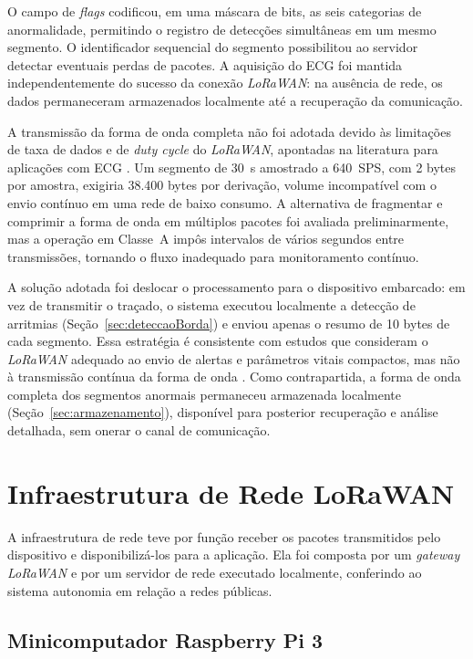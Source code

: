 O campo de \textit{flags} codificou, em uma máscara de bits, as seis categorias de anormalidade, permitindo o registro de detecções simultâneas em um mesmo segmento. O identificador sequencial do segmento possibilitou ao servidor detectar eventuais perdas de pacotes. A aquisição do \acs{ECG} foi mantida independentemente do sucesso da conexão \textit{LoRaWAN}: na ausência de rede, os dados permaneceram armazenados localmente até a recuperação da comunicação.

A transmissão da forma de onda completa não foi adotada devido às limitações de taxa de dados e de \textit{duty cycle} do \textit{LoRaWAN}, apontadas na literatura para aplicações com \acs{ECG} \citep{lorawanWaveform, 3-lead}. Um segmento de 30~s amostrado a 640~SPS, com 2 bytes por amostra, exigiria 38.400 bytes por derivação, volume incompatível com o envio contínuo em uma rede de baixo consumo. A alternativa de fragmentar e comprimir a forma de onda em múltiplos pacotes foi avaliada preliminarmente, mas a operação em Classe~A impôs intervalos de vários segundos entre transmissões, tornando o fluxo inadequado para monitoramento contínuo.

A solução adotada foi deslocar o processamento para o dispositivo embarcado: em vez de transmitir o traçado, o sistema executou localmente a detecção de arritmias (Seção~\ref{sec:deteccaoBorda}) e enviou apenas o resumo de 10 bytes de cada segmento. Essa estratégia é consistente com estudos que consideram o \textit{LoRaWAN} adequado ao envio de alertas e parâmetros vitais compactos, mas não à transmissão contínua da forma de onda \citep{lorawanWaveform, ecgCompressionLora}. Como contrapartida, a forma de onda completa dos segmentos anormais permaneceu armazenada localmente (Seção~\ref{sec:armazenamento}), disponível para posterior recuperação e análise detalhada, sem onerar o canal de comunicação.


\section{Infraestrutura de Rede LoRaWAN}
\label{sec:infraLora}

A infraestrutura de rede teve por função receber os pacotes transmitidos pelo dispositivo e disponibilizá-los para a aplicação. Ela foi composta por um \textit{gateway} \textit{LoRaWAN} e por um servidor de rede executado localmente, conferindo ao sistema autonomia em relação a redes públicas.

\subsection{Minicomputador Raspberry Pi 3}
\label{sec:rpi3}

